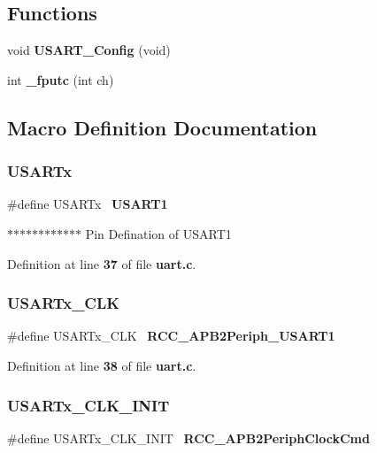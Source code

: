 \subsection*{Functions}
\begin{DoxyCompactItemize}
\item 
void \textbf{ U\+S\+A\+R\+T\+\_\+\+Config} (void)
\item 
int \textbf{ \+\_\+fputc} (int ch)
\end{DoxyCompactItemize}


\subsection{Macro Definition Documentation}
\mbox{\label{uart_8c_aea29ff83910db519b6c575b4e5a1db98}} 
\subsubsection{U\+S\+A\+R\+Tx}
{\footnotesize\ttfamily \#define U\+S\+A\+R\+Tx~\textbf{ U\+S\+A\+R\+T1}}

$\ast$$\ast$$\ast$$\ast$$\ast$$\ast$$\ast$$\ast$$\ast$$\ast$$\ast$$\ast$ Pin Defination of U\+S\+A\+R\+T1 

Definition at line \textbf{ 37} of file \textbf{ uart.\+c}.

\mbox{\label{uart_8c_a6e158a59c1028938cabdda084cbc7fbe}} 
\subsubsection{U\+S\+A\+R\+Tx\+\_\+\+C\+LK}
{\footnotesize\ttfamily \#define U\+S\+A\+R\+Tx\+\_\+\+C\+LK~\textbf{ R\+C\+C\+\_\+\+A\+P\+B2\+Periph\+\_\+\+U\+S\+A\+R\+T1}}



Definition at line \textbf{ 38} of file \textbf{ uart.\+c}.

\mbox{\label{uart_8c_a11f537ea0a554e2e30da6163b432edde}} 
\subsubsection{U\+S\+A\+R\+Tx\+\_\+\+C\+L\+K\+\_\+\+I\+N\+IT}
{\footnotesize\ttfamily \#define U\+S\+A\+R\+Tx\+\_\+\+C\+L\+K\+\_\+\+I\+N\+IT~\textbf{ R\+C\+C\+\_\+\+A\+P\+B2\+Periph\+Clock\+Cmd}}



